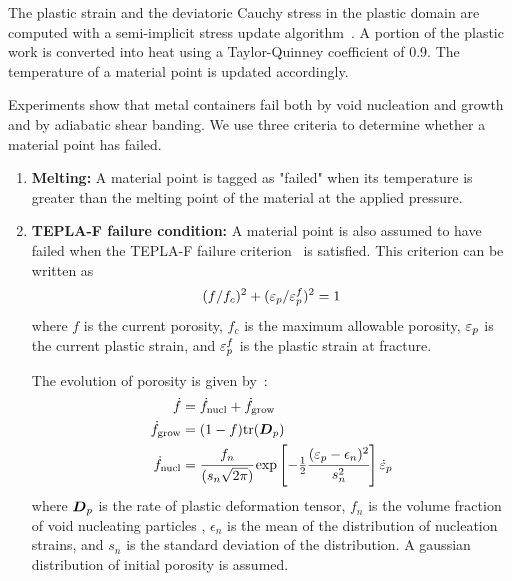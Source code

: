   The plastic strain and the deviatoric Cauchy stress in the plastic domain 
  are computed with a semi-implicit stress update 
  algorithm~\cite{Nemat1991,Maudlin1996}.  A portion of the plastic work is
  converted into heat using a Taylor-Quinney coefficient of 0.9.  The 
  temperature of a material point is updated accordingly.
  
  Experiments show that metal containers fail both by void nucleation and growth
  and by adiabatic shear banding.  We use three criteria to determine whether a
  material point has failed.
  
  \begin{enumerate}
    \item {
       {\bf Melting:}\hspace{12pt}  
       A material point is tagged as "failed" when its 
       temperature is greater than the melting point of the material at the 
       applied pressure.  
       \vspace{10pt}
       }

    \item {
       {\bf TEPLA-F failure condition:} \hspace{12pt}
       A material point is also assumed
       to have failed when the TEPLA-F failure criterion~\cite{Johnson1988} 
       is satisfied.  This criterion can be written as
       \begin{equation}
         (f/f_c)^2 + (\varepsilon_p/\varepsilon_p^f)^2 = 1
       \end{equation}
       where $f$ is the current porosity, $f_c$ is the maximum 
       allowable porosity, $\varepsilon_p$ is the current plastic strain, and
       $\varepsilon_p^f$ is the plastic strain at fracture.

       The evolution of porosity is given by~\cite{Chu1980,Ramaswamy1998a}: 
       \begin{align}
         \dot{f} &= \dot{f}_{\text{nucl}} + \dot{f}_{\text{grow}} \\
         \dot{f}_{\text{grow}} & = (1-f) \text{tr}(\boldsymbol{D}_p) \\
         \dot{f}_{\text{nucl}} & = \cfrac{f_n}{(s_n \sqrt{2\pi})}
           \exp\left[-\tfrac{1}{2} \cfrac{(\varepsilon_p - \epsilon_n)^2}{s_n^2}\right]
           \dot{\varepsilon}_{p}
       \end{align}
       where $\boldsymbol{D}_p$ is the rate of plastic deformation tensor, $f_n$ is the 
       volume fraction of void nucleating particles , $\epsilon_n$ is the mean 
       of the distribution of nucleation strains, and $s_n$ is the standard 
       deviation of the distribution.  A gaussian distribution of initial 
       porosity is assumed.

}
\end{enumerate}
